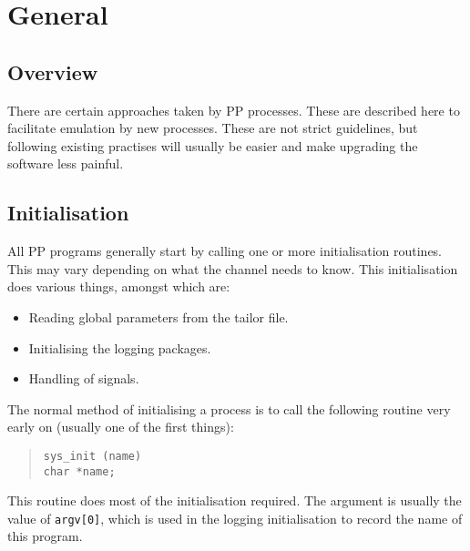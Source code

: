 \chapter {General}

\section {Overview}

There are certain approaches taken by PP processes.  These are described
here to facilitate emulation by new processes. These are not strict
guidelines, but following existing practises will usually be easier
and make upgrading the software less painful.

\section {Initialisation}

All PP programs generally start by calling one or more initialisation
routines. This may vary depending on what the channel needs to know.
This initialisation does various things, amongst which are:
\begin{itemize}
\item	Reading global parameters from the tailor file.
\item	Initialising the logging packages.
\item	Handling of signals.
\end{itemize}

The normal method of initialising a process is to call the following
routine very early on (usually one of the first things):
\begin{quote}\begin{verbatim}
sys_init (name)
char *name;
\end{verbatim}\end{quote}

This routine does most of the initialisation required. The argument is
usually the value of \verb|argv[0]|, which is used in the logging
initialisation to record the name of this program.

